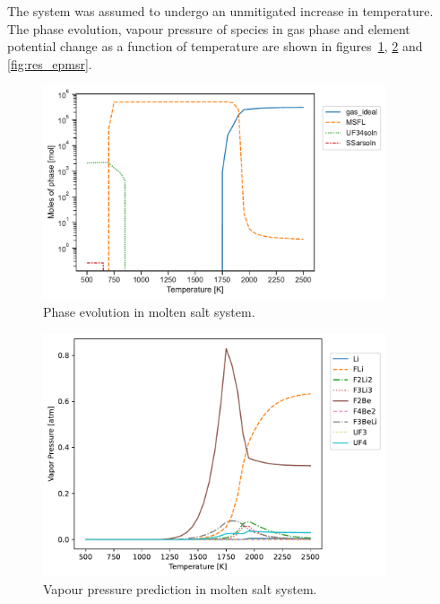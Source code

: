     The system was assumed to undergo an unmitigated increase in temperature. The phase evolution, vapour pressure of species in gas phase and element potential change as a function of temperature are shown in figures~\ref{fig:res_molemsr}, \ref{fig:res_vpmsr} and \ref{fig:res_epmsr}.
        \begin{figure}[ht]
        \centering
        \includegraphics[width=0.9\textwidth]{figures/chapter-7/msr_moles.pdf}
        \caption{Phase evolution in molten salt system.}
        \label{fig:res_molemsr}
    \end{figure}
    \begin{figure}[ht]
        \centering
        \includegraphics[width=0.9\textwidth]{figures/chapter-7/msr_vp.pdf}
        \caption{Vapour pressure prediction in molten salt system.}
        \label{fig:res_vpmsr}
    \end{figure}
